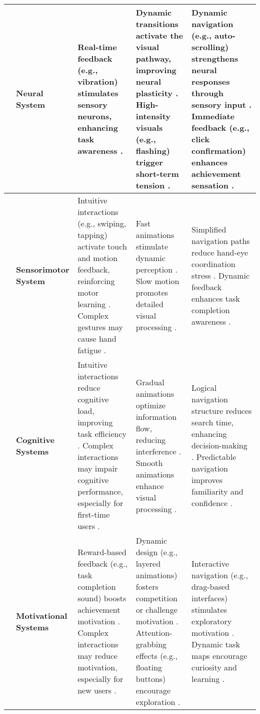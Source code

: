 \begin{table*}[ht]
\begin{tabularx}{\textwidth}{|>{\centering\arraybackslash}m{0.6cm}|>{\centering\arraybackslash}m{1.55cm}|>{\centering\arraybackslash}m{4.6cm}|>{\centering\arraybackslash}m{4.6cm}|>{\centering\arraybackslash}m{4.6cm}|}
\multirow{4}{*}{\rotatebox{90}{\parbox{3cm}{\centering \textbf{Multisystem \\ Activation}}}} 

& \cellcolor[HTML]{F0EFF7} \textbf{Neural System} & 
Real-time feedback (e.g., vibration) stimulates sensory neurons, enhancing task awareness \cite{olugbade2023touch}. & 
Dynamic transitions activate the visual pathway, improving neural plasticity \cite{yoo2005processing}. High-intensity visuals (e.g., flashing) trigger short-term tension \cite{hanjalic2005affective}. & 
Dynamic navigation (e.g., auto-scrolling) strengthens neural responses through sensory input \cite{sundar2014user}. Immediate feedback (e.g., click confirmation) enhances achievement sensation \cite{wang2024enhancing}. \\ \cline{2-5}

& \cellcolor[HTML]{F0EFF7} \textbf{Sensorimotor System} & 
Intuitive interactions (e.g., swiping, tapping) activate touch and motion feedback, reinforcing motor learning \cite{sundar2014user}. Complex gestures may cause hand fatigue \cite{wodehouse2014exploring}. & 
Fast animations stimulate dynamic perception \cite{hanjalic2005affective}. Slow motion promotes detailed visual processing \cite{wollner2018slow}. & 
Simplified navigation paths reduce hand-eye coordination stress \cite{wang2024enhancing}.  Dynamic feedback enhances task completion awareness \cite{sundar2014user}. \\ \cline{2-5}

& \cellcolor[HTML]{F0EFF7} \textbf{Cognitive Systems} & 
Intuitive interactions reduce cognitive load, improving task efficiency \cite{wang2024enhancing}. Complex interactions may impair cognitive performance, especially for first-time users \cite{sundar2014user}. & 
Gradual animations optimize information flow, reducing interference \cite{lockyer2012affective}. Smooth animations enhance visual processing \cite{yoo2005processing}. & 
Logical navigation structure reduces search time, enhancing decision-making \cite{sheng2012effects}. Predictable navigation improves familiarity and confidence \cite{abdelaal2023accessibility}. \\ \cline{2-5}

& \cellcolor[HTML]{F0EFF7} \textbf{Motivational Systems} & 
Reward-based feedback (e.g., task completion sound) boosts achievement motivation \cite{amoor2014designing, wang2024enhancing}. Complex interactions may reduce motivation, especially for new users \cite{wodehouse2014exploring}. & 
Dynamic design (e.g., layered animations) fosters competition or challenge motivation \cite{lockyer2012affective}. Attention-grabbing effects (e.g., floating buttons) encourage exploration \cite{wollner2018slow}. & 
Interactive navigation (e.g., drag-based interfaces) stimulates exploratory motivation \cite{amoor2014designing}. Dynamic task maps encourage curiosity and learning \cite{sundar2014user}. \\ \hline


\end{tabularx}
\end{table*}
